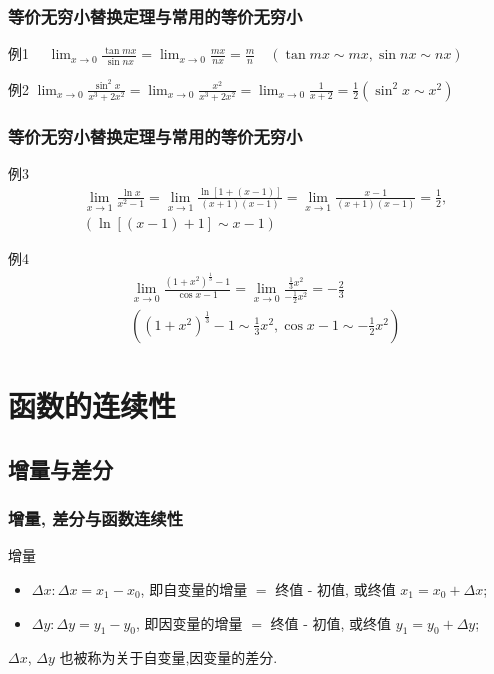 \documentclass[
10pt,
aspectratio=43,
]{beamer}
\begin{document}
\begin{frame}
\frametitle{等价无穷小替换定理与常用的等价无穷小}
\begin{exampleblock}{例1}
 $ \quad \lim _{x \rightarrow 0} \frac{\tan m x}{\sin n x}=\lim _{x \rightarrow 0} \frac{m x}{n x}=\frac{m}{n} \quad(\tan m x \sim m x, \sin n x\sim n x)$
\end{exampleblock}
\pause
\begin{exampleblock}{例2}
 $ \lim _{x \rightarrow 0} \frac{\sin ^2 x}{x^3+2 x^2}=\lim _{x \rightarrow 0} \frac{x^2}{x^3+2 x^2}=\lim _{x \rightarrow 0} \frac{1}{x+2}=\frac{1}{2}\left(\sin ^2 x \sim x^2\right)$
\end{exampleblock}
\end{frame}
\begin{frame}
\frametitle{等价无穷小替换定理与常用的等价无穷小}
\begin{exampleblock}{例3}
\begin{equation*}
\begin{aligned}
&\lim _{x \rightarrow 1} \frac{\ln x}{x^2-1}=\lim _{x \rightarrow 1} \frac{\ln [1+(x-1)]}{(x+1)(x-1)}=\lim _{x \rightarrow 1} \frac{x-1}{(x+1)(x-1)}=\frac{1}{2},\\
&(\ln [(x-1)+1] \sim x-1)
\end{aligned}
\end{equation*}
\end{exampleblock}
\pause
\begin{exampleblock}{例4} \begin{equation*}
\begin{aligned}
& \lim _{x \rightarrow 0} \frac{\left(1+x^2\right)^{\frac{1}{3}}-1}{\cos x-1}=\lim _{x \rightarrow 0} \frac{\frac{1}{3} x^2}{-\frac{1}{2} x^2}= -\frac{2}{3}\\
& \left(\left(1+x^2\right)^{\frac{1}{3}}-1 \sim \frac{1}{3} x^2, \cos x-1 \sim-\frac{1}{2} x^2\right)
\end{aligned}
\end{equation*}
\end{exampleblock}
\end{frame}

\section{函数的连续性}
\subsection{增量与差分}

\begin{frame}
\frametitle{增量, 差分与函数连续性}
\begin{block}{增量}
\begin{itemize}
    \item $\Delta x: \Delta x=x_1-x_0$, 即自变量的增量 $=$ 终值 - 初值, 或终值 $x_1=x_0+\Delta x$;
    \item $\Delta y: \Delta y=y_1-y_0$, 即因变量的增量 $=$ 终值 - 初值, 或终值 $y_1=y_0+\Delta y$;
\end{itemize}
$\Delta x$, $\Delta y$ 也被称为关于自变量,因变量的差分.
\end{block}
\end{frame}
\end{document}

